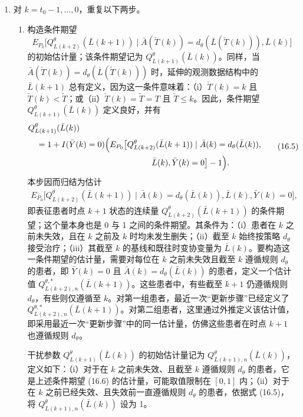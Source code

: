 \begin{enumerate}
\item 对 $k=t_0-1,\ldots,0$，重复以下两步。
\begin{enumerate}[label=(\alph*)]
\item 构造条件期望
\[
 E_{P_0}\bigl[Q^\theta_{L(k+2)}(\bar L(k+1))\mid
 \bar A(\check T(k))=d_\theta(\bar L(\check T(k))),\bar L(k)\bigr]
\]
的初始估计量；该条件期望记为 $Q^\theta_{L(k+1)}(\bar L(k))$。同样，当 $\bar A(\check T(k))=d_\theta(\bar L(\check T(k)))$ 时，延伸的观测数据结构中的 $\bar L(k+1)$ 总有定义，因为这一条件意味着：（i）$\check T(k)=k$ 且 $\check T(k)<\widetilde T$；或（ii）$\check T(k)=\widetilde T=T$ 且 $\check T\leq k$。因此，条件期望 $Q^\theta_{L(k+1)}(\bar L(k))$ 定义良好，并有
\begin{equation}
\begin{aligned}
 &Q^\theta_{L(k+1)}(\bar L(k))\\
 &\quad=1+I(\bar Y(k)=0)\Bigl(
 E_{P_0}\bigl[Q^\theta_{L(k+2)}(\bar L(k+1))\mid
 \bar A(k)=d_\theta(\bar L(k)),\\
 &\hspace{15em}\bar L(k),\bar Y(k)=0\bigr]-1\Bigr).
\end{aligned}
\tag{16.5}
\end{equation}
本步因而归结为估计
\begin{equation}
\begin{aligned}
 E_{P_0}\bigl[Q^\theta_{L(k+2)}(\bar L(k+1))\mid
 \bar A(k)=d_\theta(\bar L(k)),\bar L(k),\bar Y(k)=0\bigr],
\end{aligned}
\tag{16.6}
\end{equation}
即表征患者时点 $k+1$ 状态的连续量 $Q^\theta_{L(k+2)}(\bar L(k+1))$ 的条件期望；这个量本身也是 0 与 1 之间的条件期望。其条件为：（i）患者在 $k$ 之前未失效，且在 $k$ 之前及 $k$ 时均未发生删失；（ii）截至 $k$ 始终按策略 $d_\theta$ 接受治疗；（iii）其截至 $k$ 的基线和既往时变协变量为 $\bar L(k)$。要构造这一条件期望的估计量，需要对每位在 $k$ 之前未失效且截至 $k$ 遵循规则 $d_\theta$ 的患者，即 $\bar Y(k)=0$ 且 $\bar A(k)=d_\theta(\bar L(k))$ 的患者，定义一个估计值 $Q^{\theta,*}_{L(k+2),n}(\bar L(k+1))$。这些患者中，有些截至 $k+1$ 仍遵循规则 $d_\theta$，有些则仅遵循至 $k$。对第一组患者，最近一次“更新步骤”已经定义了 $Q^{\theta,*}_{L(k+2),n}(\bar L(k+1))$。对第二组患者，这里通过外推定义该估计值，即采用最近一次“更新步骤”中的同一估计量，仿佛这些患者在时点 $k+1$ 也遵循规则 $d_\theta$。

干扰参数 $Q^\theta_{L(k+1)}(\bar L(k))$ 的初始估计量记为 $Q^\theta_{L(k+1),n}(\bar L(k))$，定义如下：（i）对于在 $k$ 之前未失效、且截至 $k$ 遵循规则 $d_\theta$ 的患者，它是上述条件期望 (16.6) 的估计量，可能取值限制在 $[0,1]$ 内；（ii）对于在 $k$ 之前已经失效、且失效前一直遵循规则 $d_\theta$ 的患者，依据式 (16.5)，将 $Q^\theta_{L(k+1),n}(\bar L(k))$ 设为 1。


\end{enumerate}
\end{enumerate}
